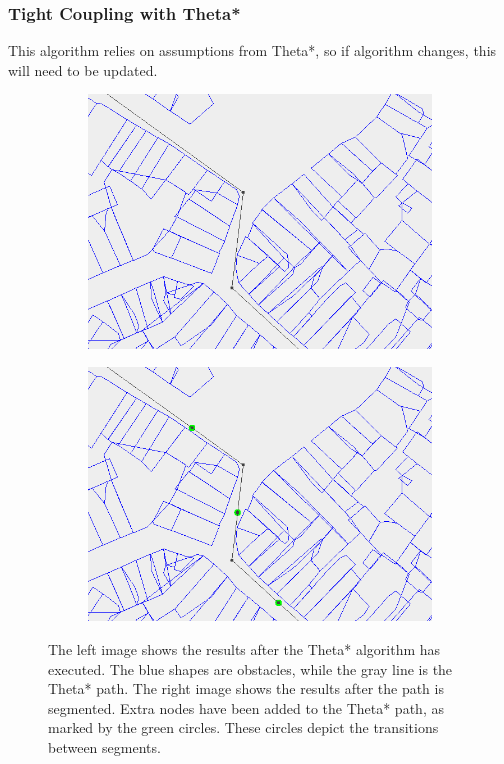 \subsubsection{Tight Coupling with Theta*}
This algorithm relies on assumptions from Theta*, so if algorithm changes, this will need to be updated.


\begin{figure}[!t]
    \centering
    \begin{subfigure}[t]{0.47\textwidth}
        \includegraphics[width=\textwidth]{img/pre1}
    \end{subfigure}
    \hfil
    \begin{subfigure}[t]{0.47\textwidth}
        \includegraphics[width=\textwidth]{img/pre2}
    \end{subfigure}
    \caption{The left image shows the results after the Theta* algorithm has executed. The blue shapes are obstacles, while the gray line is the Theta* path. The right image shows the results after the path is segmented. Extra nodes have been added to the Theta* path, as marked by the green circles. These circles depict the transitions between segments.}\label{fig:pre-1-2}
\end{figure}

